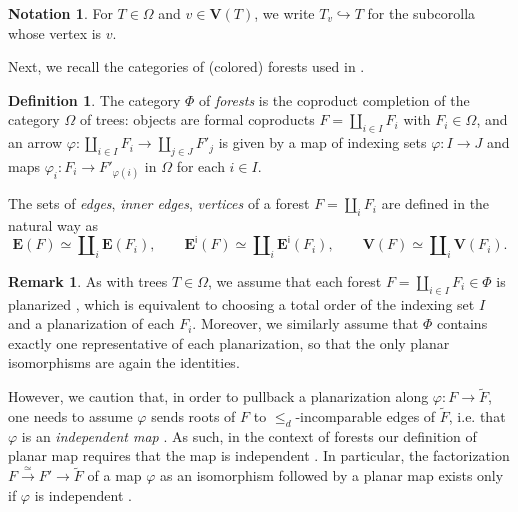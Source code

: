 \documentclass[a4paper,10pt
,draft
]{article}%
\numberwithin{equation}{section}
\numberwithin{figure}{section}
\theoremstyle{definition} %
\newtheorem{definition}[equation]{Definition}%
\newtheorem{remark}[equation]{Remark}%
\newtheorem{notation}[equation]{Notation}%
\newcommand{\1}{\ensuremath{\mathbbm 1}}%
\begin{document}
\begin{notation}
        \label{TV_NOT}
        For $T \in \Omega$ and $v \in \boldsymbol{V}(T)$, 
        we write $T_v \hookrightarrow T$
        for the subcorolla whose vertex is $v$.
\end{notation}

Next, we recall the categories of (colored) forests used in 
\cite[Def. \ref{OC-COLFOR DEF}]{BP_FCOP}.


\begin{definition}\label{FOR DEF}
      The category $\Phi$ of \textit{forests} is the coproduct completion of the category $\Omega$ of trees:
      objects are formal coproducts 
      $F = \amalg_{i \in I} F_i$ with $F_i \in \Omega$,
      and an arrow 
      $\varphi \colon \amalg_{i \in I} F_i \to
      \amalg_{j \in J} F'_j$ is given by
      a map of indexing sets $\varphi \colon I \to J$ and
      maps $\varphi_i \colon F_i \to F'_{\varphi(i)}$ in $\Omega$ for each $i \in I$.

The sets of \emph{edges}, \emph{inner edges}, \emph{vertices}
of a forest $F = \amalg_i F_i$
are defined in the natural way as
\[
	\boldsymbol{E}(F)
	\simeq
	\amalg_i \boldsymbol{E}(F_i),
\qquad
	\boldsymbol{E}^{\mathsf{i}}(F)
	\simeq
	\amalg_i \boldsymbol{E}^{\mathsf{i}}(F_i),
\qquad
	\boldsymbol{V}(F)
	\simeq
	\amalg_i \boldsymbol{V}(F_i).
\]
\end{definition}


\begin{remark}
        \label{PLANARFOR_REM}
        As with trees $T \in \Omega$, 
        we assume that each forest $F = \amalg_{i \in I} F_i \in \Phi$
        is planarized \cite[Def. 3.2 and Rem. 3.15]{BP_geo}, 
        which is equivalent to choosing a total order of the indexing set $I$ and a planarization of each $F_i$.
        Moreover, we similarly assume that $\Phi$ contains exactly one representative of each planarization,
        so that the only planar isomorphisms are again the identities.
        
        However, we caution that, in order to pullback a planarization
        along $\varphi \colon F \to \tilde{F}$,
        one needs to assume  
        $\varphi$ sends roots of $F$
        to $\leq_d$-incomparable edges of $\tilde{F}$, 
        i.e. that $\varphi$ is an \emph{independent map}
        \cite[Def. 5.28]{Per18}.
        As such, in the context of forests our definition of 
        planar map requires that the map is independent
        \cite[Prop. 3.19]{BP_geo}.
        In particular, the factorization
        $F \xrightarrow{\simeq} F' \to \tilde{F}$
        of a map $\varphi$ as an isomorphism followed by a planar map
        exists only if $\varphi$ is independent
        \cite[Prop. 3.24]{BP_geo}.
\end{remark}
\end{document}
